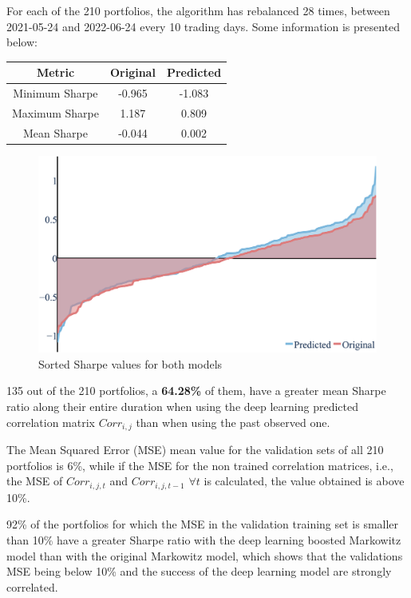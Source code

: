 \documentclass{article}
\begin{document}
For each of the 210 portfolios, the algorithm has rebalanced 28 times, between 2021-05-24 and 2022-06-24 every 10 trading days. Some information is presented below:

\begin{center}
\begin{tabular}{ |c|c|c|} 
\hline
 \textbf{Metric} & \textbf{Original} & \textbf{Predicted}\\ 
 \hline
 Minimum Sharpe & -0.965 & -1.083\\ 
 \hline
 Maximum Sharpe & 1.187 & 0.809\\ 
 \hline
 Mean Sharpe & -0.044 & 0.002\\ 
 \hline
 \end{tabular}
\end{center}



\begin{figure}
\includegraphics[width=1\linewidth]{Plots/shorder.png}
\caption{Sorted Sharpe values for both models}\label{wrap-fig:2}
\end{figure}

135 out of the 210 portfolios, a \textbf{64.28\%} of them, have a greater mean Sharpe ratio along their entire duration when using the deep learning predicted correlation matrix $Corr_{i,j}$ than when using the past observed one.

The Mean Squared Error (MSE) mean value for the validation sets of all 210 portfolios is 6\%, while if the MSE for the non trained correlation matrices, i.e., the MSE of $Corr_{i,j,t}$ and $Corr_{i,j,t-1}$ $\forall t$ is calculated, the value obtained is above 10\%.

92\% of the portfolios for which the MSE in the validation training set is smaller than 10\% have a greater Sharpe ratio with the deep learning boosted Markowitz model than with the original Markowitz model, which shows that the validations MSE being below 10\% and the success of the deep learning model are strongly correlated.
\end{document}
